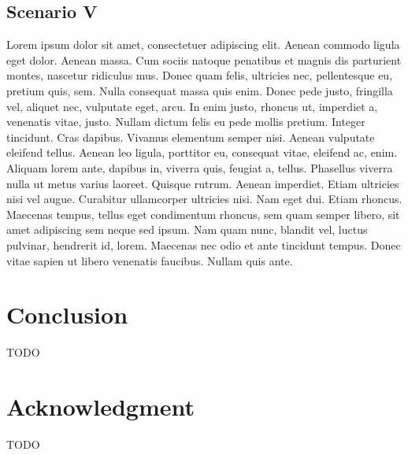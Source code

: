 \documentclass[conference]{IEEEtran}
\begin{document}
\subsection{Scenario V}
\label{scenario5}

Lorem ipsum dolor sit amet, consectetuer adipiscing elit. Aenean commodo ligula
eget dolor. Aenean massa. Cum sociis natoque penatibus et magnis dis parturient
montes, nascetur ridiculus mus. Donec quam felis, ultricies nec, pellentesque
eu, pretium quis, sem. Nulla consequat massa quis enim. Donec pede justo,
fringilla vel, aliquet nec, vulputate eget, arcu. In enim justo, rhoncus ut,
imperdiet a, venenatis vitae, justo. Nullam dictum felis eu pede mollis pretium.
Integer tincidunt. Cras dapibus. Vivamus elementum semper nisi. Aenean vulputate
eleifend tellus. Aenean leo ligula, porttitor eu, consequat vitae, eleifend ac,
enim. Aliquam lorem ante, dapibus in, viverra quis, feugiat a, tellus. Phasellus
viverra nulla ut metus varius laoreet. Quisque rutrum. Aenean imperdiet. Etiam
ultricies nisi vel augue. Curabitur ullamcorper ultricies nisi. Nam eget dui.
Etiam rhoncus. Maecenas tempus, tellus eget condimentum rhoncus, sem quam semper
libero, sit amet adipiscing sem neque sed ipsum. Nam quam nunc, blandit vel,
luctus pulvinar, hendrerit id, lorem. Maecenas nec odio et ante tincidunt
tempus. Donec vitae sapien ut libero venenatis faucibus. Nullam quis ante. 

\section{Conclusion}
TODO

\section*{Acknowledgment}
TODO



\end{document}
